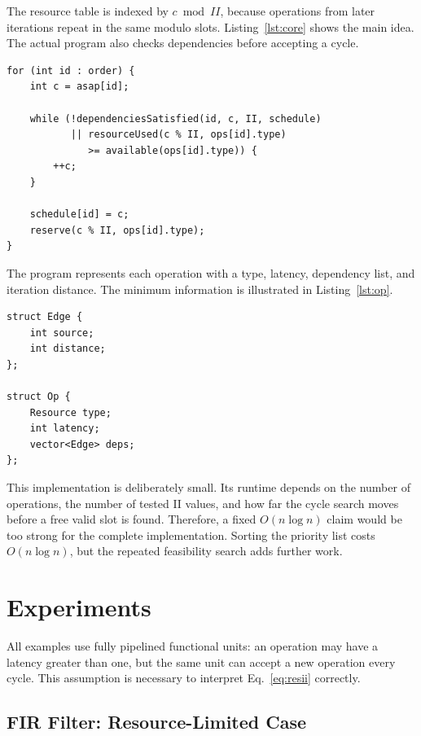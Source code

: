 \documentclass[conference]{IEEEtran}
\begin{document}
The resource table is indexed by $c\bmod II$, because operations from later
iterations repeat in the same modulo slots. Listing~\ref{lst:core} shows the main
idea. The actual program also checks dependencies before accepting a cycle.

\begin{lstlisting}[caption={Simplified greedy placement loop.},
label={lst:core}]
for (int id : order) {
    int c = asap[id];

    while (!dependenciesSatisfied(id, c, II, schedule)
           || resourceUsed(c % II, ops[id].type)
              >= available(ops[id].type)) {
        ++c;
    }

    schedule[id] = c;
    reserve(c % II, ops[id].type);
}
\end{lstlisting}


The program represents each operation with a type, latency, dependency list, and
iteration distance. The minimum information is illustrated in
Listing~\ref{lst:op}.

\begin{lstlisting}[caption={Operation representation used by the scheduler.},
label={lst:op}]
struct Edge {
    int source;
    int distance;
};

struct Op {
    Resource type;
    int latency;
    vector<Edge> deps;
};
\end{lstlisting}

This implementation is deliberately small. Its runtime depends on the number of
operations, the number of tested II values, and how far the cycle search moves
before a free valid slot is found. Therefore, a fixed $O(n\log n)$ claim would be
too strong for the complete implementation. Sorting the priority list costs
$O(n\log n)$, but the repeated feasibility search adds further work.

\section{Experiments}

All examples use fully pipelined functional units: an operation may have a latency
greater than one, but the same unit can accept a new operation every cycle. This
assumption is necessary to interpret Eq.~\eqref{eq:resii} correctly.

\subsection{FIR Filter: Resource-Limited Case}
\end{document}
